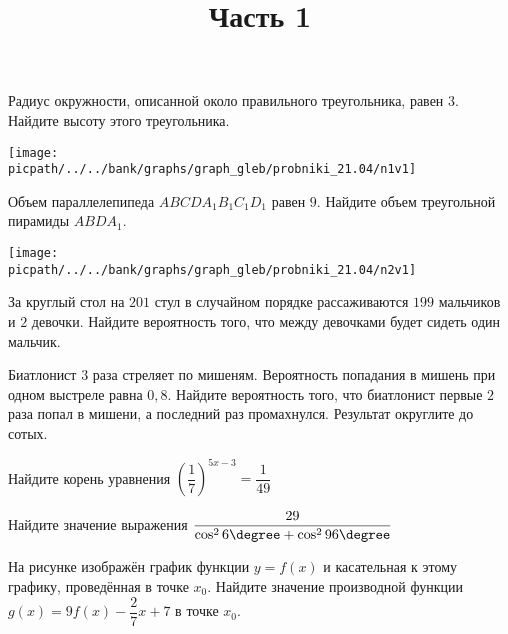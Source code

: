 %
%

\begin{training}
	\title{Часть 1}
	\egepreambone
	\begin{listofex}
		\item
		\begin{minipage}[t]{\bodywidth}
			Радиус окружности, описанной около правильного треугольника, равен \( 3 \). Найдите высоту этого треугольника.
			\foranswer
		\end{minipage}
		\gapwidth
		\begin{minipage}[t]{\picwidth}
			\texttt{[image: \\picpath/../../bank/graphs/graph\_gleb/probniki\_21.04/n1v1]}
		\end{minipage}
		\item
		\begin{minipage}[t]{\bodywidth}
			Объем параллелепипеда \( ABCDA_1B_1C_1D_1 \) равен \( 9 \). Найдите объем треугольной пирамиды \( ABDA_1 \).
			\foranswer
		\end{minipage}
		\gapwidth
		\begin{minipage}[t]{\picwidth}
			\texttt{[image: \\picpath/../../bank/graphs/graph\_gleb/probniki\_21.04/n2v1]}
		\end{minipage}
			\item За круглый стол на \( 201 \) стул в случайном порядке рассаживаются \( 199 \) мальчиков и \( 2 \) девочки. Найдите вероятность того, что между девочками будет сидеть один мальчик.
		\foranswer
		\item Биатлонист \( 3 \) раза стреляет по мишеням. Вероятность попадания в мишень при одном выстреле равна \( 0,8 \). Найдите вероятность того, что биатлонист первые \( 2 \) раза попал в мишени, а последний раз промахнулся. Результат округлите до сотых.
		\foranswer
	\end{listofex}
	\newpage
	\phantom{Часть 1}
	\begin{listofex}[resume]
		\item Найдите корень уравнения \( \left( \dfrac{1}{7} \right)^{5x-3}=\dfrac{1}{49} \)
		\foranswer
		\item Найдите значение выражения \( \dfrac{29}{\cos^26\degree+\cos^296\degree} \)
		\foranswer
		\item
		На рисунке изображён график функции \( y=f(x) \) и касательная к этому графику, проведённая в точке \( x_0 \). Найдите значение производной функции \( g(x)=9f(x)-\dfrac{2}{7}x+7 \) в точке \( x_0 \).

\end{listofex}
\end{training}
